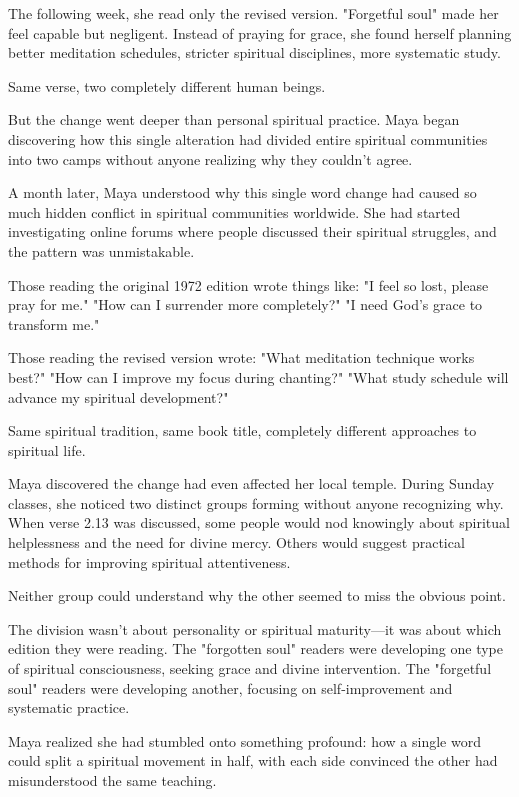 \documentclass[11pt,twoside]{book}
\begin{document}
The following week, she read only the revised version. "Forgetful soul" made her feel capable but negligent. Instead of praying for grace, she found herself planning better meditation schedules, stricter spiritual disciplines, more systematic study.

Same verse, two completely different human beings.

But the change went deeper than personal spiritual practice. Maya began discovering how this single alteration had divided entire spiritual communities into two camps without anyone realizing why they couldn't agree.

A month later, Maya understood why this single word change had caused so much hidden conflict in spiritual communities worldwide. She had started investigating online forums where people discussed their spiritual struggles, and the pattern was unmistakable.

Those reading the original 1972 edition wrote things like: "I feel so lost, please pray for me." "How can I surrender more completely?" "I need God's grace to transform me."

Those reading the revised version wrote: "What meditation technique works best?" "How can I improve my focus during chanting?" "What study schedule will advance my spiritual development?"

Same spiritual tradition, same book title, completely different approaches to spiritual life.

Maya discovered the change had even affected her local temple. During Sunday classes, she noticed two distinct groups forming without anyone recognizing why. When verse 2.13 was discussed, some people would nod knowingly about spiritual helplessness and the need for divine mercy. Others would suggest practical methods for improving spiritual attentiveness.

Neither group could understand why the other seemed to miss the obvious point.

The division wasn't about personality or spiritual maturity—it was about which edition they were reading. The "forgotten soul" readers were developing one type of spiritual consciousness, seeking grace and divine intervention. The "forgetful soul" readers were developing another, focusing on self-improvement and systematic practice.

Maya realized she had stumbled onto something profound: how a single word could split a spiritual movement in half, with each side convinced the other had misunderstood the same teaching.
\end{document}
